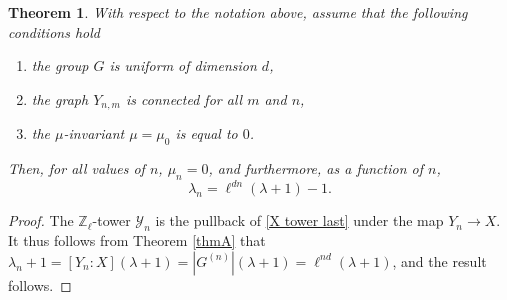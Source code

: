 \documentclass[11pt]{amsart}
\newtheorem{theorem}{Theorem}[section]
\numberwithin{equation}{section}
\theoremstyle{remark}
\newcommand{\Z}{\mathbb{Z}}
\newcommand{\cY}{\mathcal{Y}}
\begin{document}
\begin{theorem}\label{lastthm}
With respect to the notation above, assume that the following conditions hold
\begin{enumerate}
    \item the group $G$ is uniform of dimension $d$,
    \item the graph $Y_{n,m}$ is connected for all $m$ and $n$,
    \item the $\mu$-invariant $\mu=\mu_0$ is equal to $0$.
\end{enumerate}
Then, for all values of $n$, $\mu_n=0$, and furthermore, as a function of $n$, 
\begin{equation}\label{lastthm eqn}\lambda_n=\ell^{dn} (\lambda+1)-1.\end{equation}
\end{theorem}

\begin{proof}
The $\Z_\ell$-tower $\cY_n$ is the pullback of \eqref{X tower last} under the map $Y_n\rightarrow X$. It thus follows from Theorem \ref{thmA} that $\lambda_n+1=[Y_n:X](\lambda+1)=|G^{(n)}|(\lambda+1)=\ell^{nd}(\lambda+1)$, and the result follows.
\end{proof}
\end{document}
